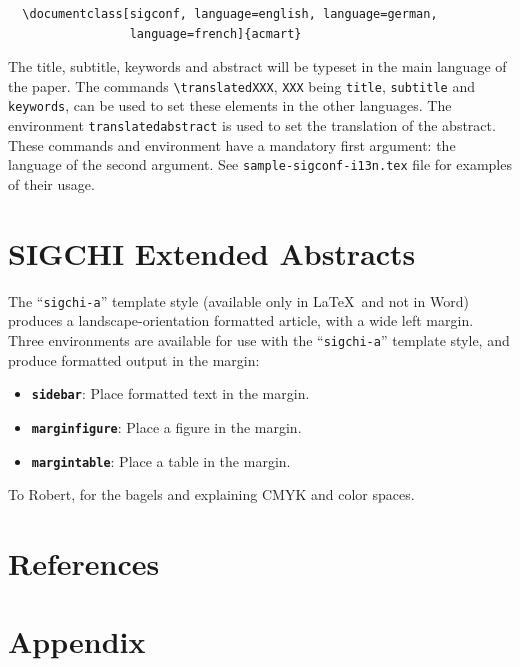 \documentclass[
  letterpaper,
  DIV=11,
  numbers=noendperiod]{scrartcl}
\providecommand{\tightlist}{%
  \setlength{\itemsep}{0pt}\setlength{\parskip}{0pt}}\usepackage{longtable,booktabs,array}
\newlength{\cslhangindent}
\newlength{\cslentryspacingunit} %
\newenvironment{CSLReferences}[2] %
 {%
  \setlength{\parindent}{0pt}
  \ifodd #1
  \let\oldpar\par
  \def\par{\hangindent=\cslhangindent\oldpar}
  \fi
  \setlength{\parskip}{#2\cslentryspacingunit}
 }%
 {}
\begin{document}
\begin{verbatim}
  \documentclass[sigconf, language=english, language=german,
                 language=french]{acmart}
\end{verbatim}

The title, subtitle, keywords and abstract will be typeset in the main
language of the paper. The commands
\texttt{\textbackslash{}translatedXXX}, \texttt{XXX} being
\texttt{title}, \texttt{subtitle} and \texttt{keywords}, can be used to
set these elements in the other languages. The environment
\texttt{translatedabstract} is used to set the translation of the
abstract. These commands and environment have a mandatory first
argument: the language of the second argument. See
\texttt{sample-sigconf-i13n.tex} file for examples of their usage.

\hypertarget{sigchi-extended-abstracts}{%
\section{SIGCHI Extended Abstracts}\label{sigchi-extended-abstracts}}

The ``\texttt{sigchi-a}'' template style (available only in \LaTeX~and
not in Word) produces a landscape-orientation formatted article, with a
wide left margin. Three environments are available for use with the
``\texttt{sigchi-a}'' template style, and produce formatted output in
the margin:

\begin{itemize}
\tightlist
\item
  \textbf{\texttt{sidebar}}: Place formatted text in the margin.
\item
  \textbf{\texttt{marginfigure}}: Place a figure in the margin.
\item
  \textbf{\texttt{margintable}}: Place a table in the margin.
\end{itemize}

To Robert, for the bagels and explaining CMYK and color spaces.

\hypertarget{references}{%
\section*{References}\label{references}}

\hypertarget{refs}{}
\begin{CSLReferences}{0}{0}
\end{CSLReferences}

\hypertarget{appendix}{%
\section{Appendix}\label{appendix}}
\end{document}

